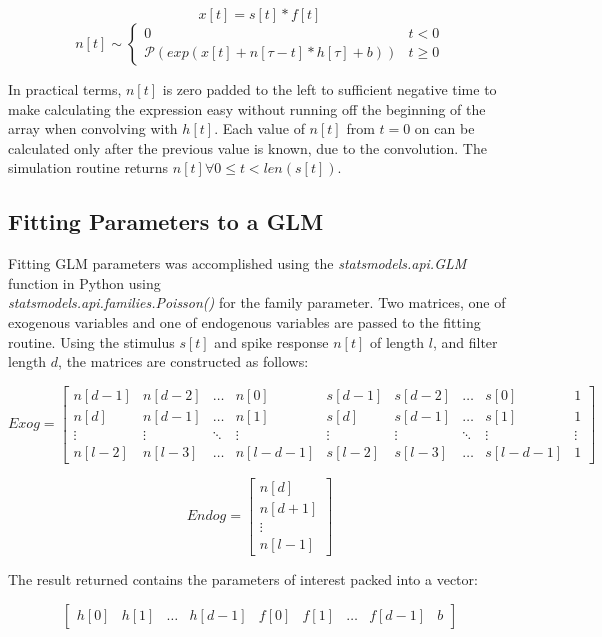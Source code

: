 \documentclass[letterpaper,titlepage,10pt]{article}
\begin{document}
$$x[t]=s[t]*f[t]$$
$$n[t]\sim
\begin{cases}
0 & t < 0\\
\mathcal{P}(exp(x[t]+n[\tau-t]*h[\tau]+b)) & t \geq 0
\end{cases}$$

In practical terms, $n[t]$ is zero padded to the left to sufficient negative time to make calculating the expression
easy without running off the beginning of the array when convolving with $h[t]$. Each value of $n[t]$ from $t=0$ on
can be calculated only after the previous value is known, due to the convolution. The simulation routine returns
$n[t] \forall 0 \leq t < len(s[t])$.

\subsection{Fitting Parameters to a GLM}

Fitting GLM parameters was accomplished using the \textit{statsmodels.api.GLM} function in
Python using \\\textit{statsmodels.api.families.Poisson()} for the family parameter. Two
matrices, one of exogenous variables and one of endogenous variables are passed to the fitting routine. Using the
stimulus $s[t]$ and spike response $n[t]$ of length $l$, and filter length $d$, the matrices are constructed as
follows:

$$Exog=
\begin{bmatrix}
n[d-1] & n[d-2] & \hdots & n[0] & s[d-1] & s[d-2] & \hdots & s[0] & 1\\
n[d] & n[d-1] & \hdots & n[1] & s[d] & s[d-1] & \hdots & s[1] & 1\\
\vdots & \vdots & \ddots & \vdots & \vdots & \vdots & \ddots & \vdots & \vdots \\
n[l-2] & n[l-3] & \hdots & n[l-d-1] & s[l-2] & s[l-3] & \hdots & s[l-d-1] & 1
\end{bmatrix}$$

$$Endog=
\begin{bmatrix}
n[d] \\
n[d+1] \\
\vdots \\
n[l-1]
\end{bmatrix}$$

The result returned contains the parameters of interest packed into a vector:

$$\begin{bmatrix}
h[0] & h[1] & \hdots & h[d-1] & f[0] & f[1] & \hdots & f[d-1] & b
\end{bmatrix}$$
\end{document}
